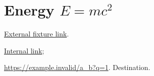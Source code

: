 \documentclass{article}
\begin{document}
\tableofcontents\section{Energy \texorpdfstring{$E=mc^2$}{E=mc2}}\label{sec:e}
\href{https://example.invalid/fixture}{External fixture link}.\par
\hyperref[sec:e]{Internal link}; \par \url{https://example.invalid/a_b?q=1}.
Destination.
\end{document}
